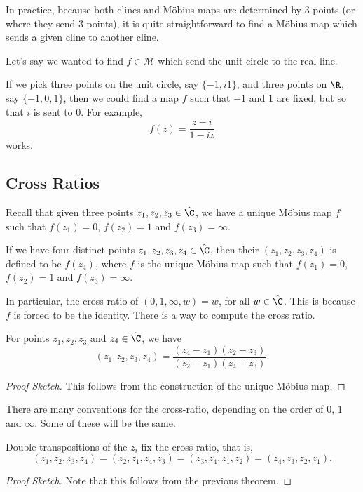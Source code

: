 \documentclass[a4paper]{scrartcl}
\newcommand{\newsection}{\subsection}
\begin{document}
In practice, because both clines and Möbius maps are determined by 3 points (or where they send 3 points), it is quite straightforward to find a Möbius map which sends a given cline to another cline.

\begin{example}
	Let's say we wanted to find $f \in \mathcal{M}$ which send the unit circle to the real line.

	If we pick three points on the unit circle, say $\{-1, i 1\}$, and three points on $\R$, say $\{-1, 0, 1\}$, then we could find a map $f$ such that $-1$ and $1$ are fixed, but so that $i$ is sent to $0$. For example,
	$$
	f(z) = \frac{z - i}{1 - iz}
	$$
	works.
\end{example}

\newsection{Cross Ratios}

Recall that given three points $z_1, z_2, z_3 \in \hat{\C}$, we have a unique Möbius map $f$ such that $f(z_1) = 0$, $f(z_2) = 1$ and $f(z_3) = \infty$.

\begin{definition}
	If we have four distinct points $z_1, z_2, z_3, z_4 \in \hat{\C}$, then their  $(z_1, z_2, z_3, z_4)$ is defined to be $f(z_4)$, where $f$ is the unique Möbius map such that $f(z_1) = 0$, $f(z_2) = 1$ and $f(z_3) = \infty$.
\end{definition}

In particular, the cross ratio of $(0, 1, \infty, w) = w$, for all $w \in \hat{\C}$. This is because $f$ is forced to be the identity. There is a way to compute the cross ratio.

\begin{theorem}
For points $z_1, z_2, z_3$ and $z_4 \in \hat{\C}$, we have
$$
(z_1, z_2 , z_3, z_4) = \frac{(z_4 - z_1)(z_2 - z_3)}{(z_2 - z_1)(z_4 - z_3)}.
$$
\end{theorem}
\begin{proof}[Proof Sketch]
This follows from the construction of the unique Möbius map.
\end{proof}

\begin{remark}
	There are many conventions for the cross-ratio, depending on the order of $0$, $1$ and $\infty$. Some of these will be the same.
\end{remark}

\begin{proposition}
	Double transpositions of the $z_i$ fix the cross-ratio, that is,
	$$
	(z_1, z_2, z_3, z_4) = (z_2, z_1, z_4, z_3) = (z_3, z_4, z_1, z_2) = (z_4, z_3, z_2, z_1).
	$$
\end{proposition}
\begin{proof}[Proof Sketch]
	Note that this follows from the previous theorem.
\end{proof}
\end{document}
